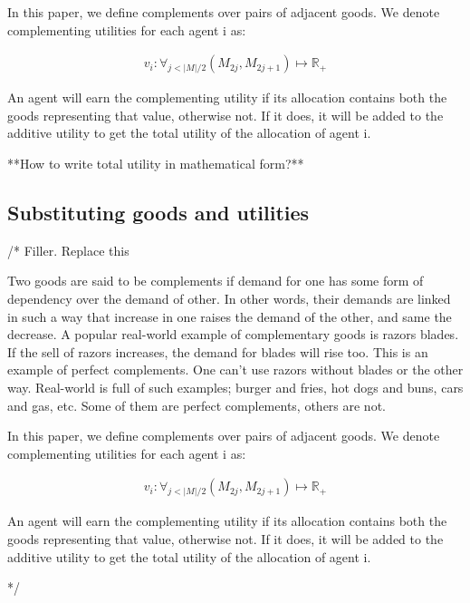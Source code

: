 In this paper, we define complements over pairs of adjacent goods. We denote complementing utilities for each agent i as: 

\begin{gather}
    v_i: \forall_{j < |M|/2} (M_{2j}, M_{2j+1})\mapsto \mathbb{R_+}
\end{gather}

An agent will earn the complementing utility if its allocation contains both the goods representing that value, otherwise not. If it does, it will be added to the additive utility to get the total utility of the allocation of agent i.

**How to write total utility in mathematical form?**

\subsection{Substituting goods and utilities}
/* Filler. Replace this

Two goods are said to be complements if demand for one has some form of dependency over the demand of other. In other words, their demands are linked in such a way that increase in one raises the demand of the other, and same the decrease. A popular real-world example of complementary goods is razors blades. If the sell of razors increases, the demand for blades will rise too. This is an example of perfect complements. One can't use razors without blades or the other way. Real-world is full of such examples; burger and fries, hot dogs and buns, cars and gas, etc. Some of them are perfect complements, others are not.

In this paper, we define complements over pairs of adjacent goods. We denote complementing utilities for each agent i as: 

\begin{gather}
    v_i: \forall_{j < |M|/2} (M_{2j}, M_{2j+1})\mapsto \mathbb{R_+}
\end{gather}

An agent will earn the complementing utility if its allocation contains both the goods representing that value, otherwise not. If it does, it will be added to the additive utility to get the total utility of the allocation of agent i.

*/

